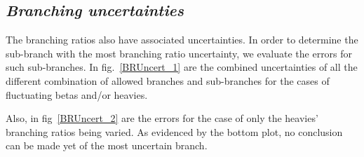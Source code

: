 \documentclass{JINST}
\begin{document}
       \subsection*{\it Branching uncertainties}

      The branching ratios also have associated uncertainties. In order to determine the sub-branch with the most branching ratio uncertainty, we 
      evaluate the errors for such sub-branches. In fig.~\ref{BRUncert_1} are the combined uncertainties
      of all the different combination of allowed branches and sub-branches for the cases of fluctuating betas and/or heavies.
      
      Also, in fig~\ref{BRUncert_2}
      are the errors for the case of only the heavies' branching ratios being varied. As evidenced by the bottom plot, no conclusion can be made yet 
      of the most uncertain branch.
           
\end{document}
